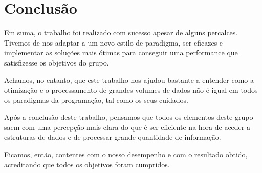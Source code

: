\documentclass{article}
\begin{document}
\clearpage

\section{Conclusão}
\par Em suma, o trabalho foi realizado com sucesso apesar de alguns percalces. Tivemos de nos adaptar a um novo estilo de paradigma, ser eficazes e implementar as soluções mais ótimas para conseguir uma performance que satisfizesse os objetivos do grupo.
\par Achamos, no entanto, que este trabalho nos ajudou bastante a entender como a otimização e o processamento de grandes volumes de dados não é igual em todos os paradigmas da programação, tal como os seus cuidados.
\par Após a conclusão deste trabalho, pensamos que todos os elementos deste grupo saem com uma percepção mais clara do que é ser eficiente na hora de aceder a estruturas de dados e de processar grande quantidade de informação.
\par Ficamos, então, contentes com o nosso desempenho e com o resultado obtido, acreditando que todos os objetivos foram cumpridos.
\end{document}
